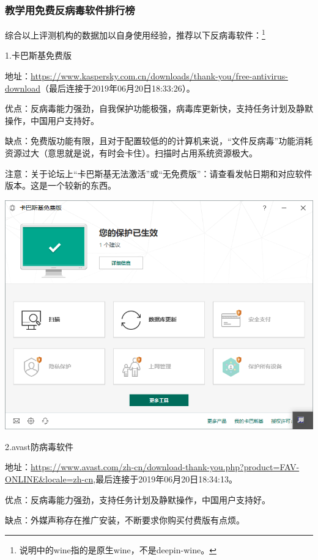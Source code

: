 \subsubsection{教学用免费反病毒软件排行榜}
综合以上评测机构的数据加以自身使用经验，推荐以下反病毒软件：\footnote{说明中的wine指的是原生wine，不是deepin-wine。}\par
1.卡巴斯基免费版\par
地址：\url{https://www.kaspersky.com.cn/downloads/thank-you/free-antivirus-download}（最后连接于2019年06月20日18:33:26）。\par
优点：反病毒能力强劲，自我保护功能极强，病毒库更新快，支持任务计划及静默操作，中国用户支持好。\par
缺点：免费版功能有限，且对于配置较低的的计算机来说，“文件反病毒”功能消耗资源过大（意思就是说，有时会卡住）。扫描时占用系统资源极大。\par
注意：关于论坛上“卡巴斯基无法激活”或“无免费版”：请查看发帖日期和对应软件版本。这是一个较新的东西。
\begin{center}
	\includegraphics[scale=0.3]{pic/kfa}
\end{center} \par
2.avast防病毒软件\par
地址：\url{https://www.avast.com/zh-cn/download-thank-you.php?product=FAV-ONLINE\&locale=zh-cn},最后连接于2019年06月20日18:34:13。\par
优点：反病毒能力强劲，支持任务计划及静默操作，中国用户支持好。\par
缺点：外媒声称存在推广安装，不断要求你购买付费版有点烦。
